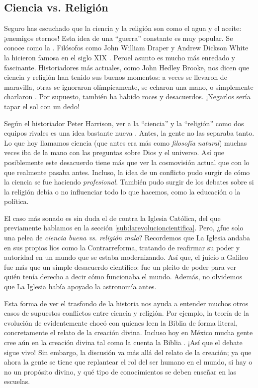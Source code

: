 \subsection*{Ciencia vs. Religión}
\label{sub:cienciavsreligion}

Seguro has escuchado que la ciencia y la religión son como el agua y el aceite:
¡enemigos eternos!
Esta idea de una ``guerra'' constante es muy popular.
Se conoce como la .
Filósofos como John William Draper y Andrew Dickson White la hicieron famosa
en el siglo XIX \cite{Draper1874,White1896}.
Peroel asunto es mucho más enredado y fascinante.
Historiadores más actuales, como John Hedley Brooke, nos dicen
que ciencia y religión han tenido sus buenos momentos:
a veces se llevaron de maravilla, otras se ignoraron olímpicamente, se echaron
una mano, o simplemente charlaron \cite{Brooke1991}.
Por supuesto, también ha habido roces y desacuerdos. ¡Negarlos sería tapar el
sol con un dedo!

Según el historiador Peter Harrison, ver a la ``ciencia'' y la ``religión'' como
dos equipos rivales es una idea bastante nueva \cite{Harrison2015}.
Antes, la gente no las separaba tanto.
Lo que hoy llamamos ciencia (que antes era más como \emph{filosofía natural})
muchas veces iba de la mano con las preguntas sobre Dios y el universo.
Así que posiblemente este desacuerdo tiene más que ver la cosmovisión actual que
con lo que realmente pasaba antes.
Incluso, la idea de un conflicto pudo surgir de cómo la ciencia se fue haciendo
\emph{profesional}.
También pudo surgir de los debates sobre si la religión debía o no influenciar
todo lo que hacemos, como la educación o la política.

El caso más sonado es sin duda el de 
contra la Iglesia Católica, del que previamente hablamos en la sección
\ref{sub:larevolucioncientifica}.
Pero, ¿fue solo una pelea de \emph{ciencia buena vs. religión mala}?
Recordemos que La Iglesia andaba en sus propios líos como la Contrarreforma,
tratando de reafirmar su poder y autoridad en un mundo que se estaba
modernizando.
Así que, el juicio a Galileo fue más que un simple desacuerdo científico:
fue un pleito de poder para ver quién tenía derecho a decir cómo funcionaba el
mundo.
Además, no olvidemos que La Iglesia había apoyado la astronomía antes.

Esta forma de ver el trasfondo de la historia nos ayuda a entender muchos otros
casos de supuestos conflictos entre ciencia y religión.
Por ejemplo, la teoría de la evolución de
 evidentemente chocó con quienes leen la
Biblia de forma literal, concretamente el relato de la creación divina.
Incluso hoy en México mucha gente cree aún en la creación divina tal como la
cuenta la Biblia \cite{Moreno2019}.
¡Así que el debate sigue vivo!
Sin embargo, la discusión va más allá del relato de la creación; ya que ahora la
gente se tiene que replantear el rol del ser humano en el mundo, si hay o no un
propósito divino, y qué tipo de conocimientos se deben enseñar en las escuelas.


